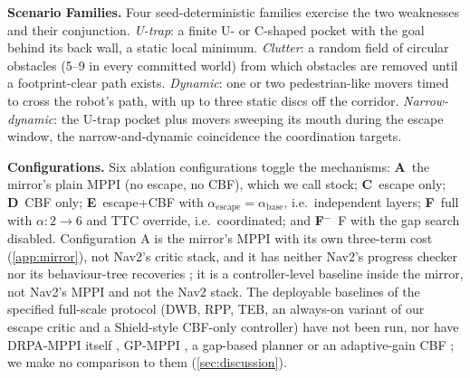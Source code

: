 \noindent\textbf{Scenario Families.} Four seed-deterministic families exercise the two weaknesses and their conjunction. \emph{U-trap}: a finite U- or C-shaped pocket with the goal behind its back wall, a static local minimum. \emph{Clutter}: a random field of circular obstacles (5--9 in every committed world) from which obstacles are removed until a footprint-clear path exists. \emph{Dynamic}: one or two pedestrian-like movers timed to cross the robot's path, with up to three static discs off the corridor. \emph{Narrow-dynamic}: the U-trap pocket plus movers sweeping its mouth during the escape window, the narrow-and-dynamic coincidence the coordination targets.

\noindent\textbf{Configurations.} Six ablation configurations toggle the mechanisms: \textbf{A}~the mirror's plain MPPI (no escape, no CBF), which we call stock; \textbf{C}~escape only; \textbf{D}~CBF only; \textbf{E}~escape+CBF with $\alpha_{\mathrm{escape}}=\alpha_{\mathrm{base}}$, i.e.\ independent layers; \textbf{F}~full \sname{} with $\alpha:2\to6$ and TTC override, i.e.\ coordinated; and \textbf{F$^{-}$}~F with the gap search disabled. Configuration A is the mirror's MPPI with its own three-term cost (\cref{app:mirror}), not Nav2's critic stack, and it has neither Nav2's progress checker nor its behaviour-tree recoveries \citep{nav2_progress,nav2_bt}; it is a controller-level baseline inside the mirror, not Nav2's MPPI and not the Nav2 stack. The deployable baselines of the specified full-scale protocol (DWB, RPP, TEB, an always-on variant of our escape critic and a Shield-style CBF-only controller) have not been run, nor have DRPA-MPPI itself \citep{drpa_mppi}, GP-MPPI \citep{gp_mppi}, a gap-based planner \citep{safer_gap} or an adaptive-gain CBF \citep{kim_adaptive_cbf}; we make no comparison to them (\cref{sec:discussion}).

